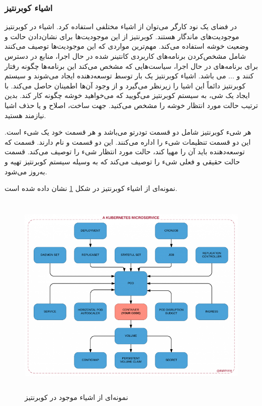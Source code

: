 \subsubsection{اشیاء کوبرنتیز}

در فضای یک نود کارگر می‌توان از اشیاء مختلفی استفاده کرد. اشیاء در کوبرنتیز موجودیت‌های ماندگار هستند. کوبرنتیز از این موجودیت‌ها برای نشان‌دادن حالت و وضعیت خوشه استفاده می‌کند. مهم‌ترین مواردی که این موجودیت‌ها توصیف می‌کنند شامل مشخص‌کردن برنامه‌های کاربردی کانتینر شده در حال اجرا، منابع در دسترس برای برنامه‌های در حال اجرا، سیاست‌هایی که مشخص می‌کند این برنامه‌ها چگونه رفتار کنند و ... می باشد. اشیاء کوبرنتیز یک بار توسط توسعه‌دهنده ایجاد می‌شوند و سیستم کوبرنتیز دائماً این اشیا را زیرنظر می‌گیرد و از وجود آن‌ها اطمینان حاصل می‌کند. با ایجاد یک شی، به سیستم کوبرنتیز می‌گویید که می‌خواهید خوشه چگونه کار کند. بدین ترتیب حالت مورد انتظار خوشه را مشخص می‌کنید. جهت ساخت، اصلاح و یا حذف اشیا نیازمند  هستید.

هر شیء کوبرنتیز شامل دو قسمت تو‌در‌تو می‌باشد و هر قسمت خود یک شیء است. این دو قسمت تنظیمات شیء را اداره می‌کنند. این دو قسمت  و  نام دارند. قسمت  که توسعه‌دهنده باید آن را مهیا کند، حالت مورد انتظار شیء را توصیف می‌کند. قسمت  حالت حقیقی و فعلی شیء را توصیف می‌کند که به وسیله سیستم کوبرنتیز تهیه و به‌روز می‌شود.

نمونه‌ای از اشیاء کوبرنتیز در شکل \ref{kubernetes-objects} نشان داده شده است.

\begin{figure}[!h]
	\centering
	\includegraphics[height=10cm]{images/kubernetes-objects}
	\caption{نمونه‌ای از اشیاء موجود در کوبرنتیز}
	\label{kubernetes-objects}
\end{figure}

